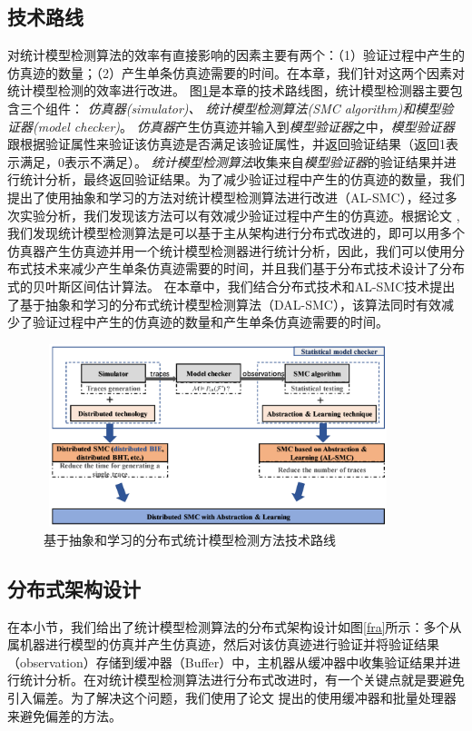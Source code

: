 \subsection{技术路线}
对统计模型检测算法的效率有直接影响的因素主要有两个：（1）验证过程中产生的仿真迹的数量；（2）产生单条仿真迹需要的时间。在本章，我们针对这两个因素对统计模型检测的效率进行改进。 图\ref{tech-map}是本章的技术路线图，统计模型检测器主要包含三个组件： \emph{仿真器(simulator)、 统计模型检测算法(SMC algorithm)和模型验证器(model checker)}。 \emph{仿真器}产生仿真迹并输入到\emph{模型验证器}之中，\emph{模型验证器}跟根据验证属性来验证该仿真迹是否满足该验证属性，并返回验证结果（返回1表示满足，0表示不满足）。 \emph{统计模型检测算法}收集来自\emph{模型验证器}的验证结果并进行统计分析，最终返回验证结果。为了减少验证过程中产生的仿真迹的数量，我们提出了使用抽象和学习的方法对统计模型检测算法进行改进（AL-SMC），经过多次实验分析，我们发现该方法可以有效减少验证过程中产生的仿真迹。根据论文  \cite{younes2005ymer}, 我们发现统计模型检测算法是可以基于主从架构进行分布式改进的，即可以用多个仿真器产生仿真迹并用一个统计模型检测器进行统计分析，因此，我们可以使用分布式技术来减少产生单条仿真迹需要的时间，并且我们基于分布式技术设计了分布式的贝叶斯区间估计算法。  在本章中，我们结合分布式技术和AL-SMC技术提出了基于抽象和学习的分布式统计模型检测算法（DAL-SMC），该算法同时有效减少了验证过程中产生的仿真迹的数量和产生单条仿真迹需要的时间。
\begin{figure}[htbp]
	{
	\centering	
	\includegraphics[width=4.0in,height=2.1in]{fig/4/paper-framework.png}
\caption{基于抽象和学习的分布式统计模型检测方法技术路线}\label{tech-map}	
	}	
\end{figure}
\subsection{分布式架构设计}
在本小节，我们给出了统计模型检测算法的分布式架构设计如图\ref{fra}所示：多个从属机器进行模型的仿真并产生仿真迹，然后对该仿真迹进行验证并将验证结果（observation）存储到缓冲器（Buffer）中，主机器从缓冲器中收集验证结果并进行统计分析。在对统计模型检测算法进行分布式改进时，有一个关键点就是要避免引入偏差。为了解决这个问题，我们使用了论文 \cite{Bulychev2012Checking}提出的使用缓冲器和批量处理器来避免偏差的方法。


